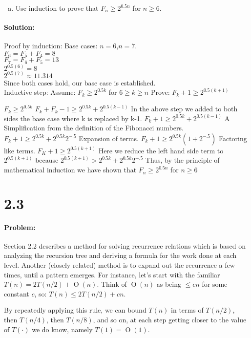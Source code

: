 \documentclass[12pt]{article}
\newcommand{\BigO}[1]{\ensuremath{\operatorname{O}\left(#1\right)}}
\begin{document}
\begin{enumerate}[(a)]
\item Use induction to prove that $F_n \geq 2^{0.5n}$ for $n \geq 6$.
\end{enumerate}

\paragraph{Solution:}
Proof by induction:
Base cases: $n=6$,$n=7$. \\
    $F_6 = F_5 + F_4 = 8$ \\
    $F_7 = F_6 + F_5 = 13$ \\
    $2^{0.5(6)} = 8$ \\
    $2^{0.5(7)} \approx 11.314$ \\
    Since both cases hold, our base case is established. \\

Inductive step:
	Assume: $F_k \geq 2^{0.5k}$ for $6 \geq k \geq n$
	Prove: $F_k+1 \geq 2^{0.5(k+1)}$

	$F_k \geq 2^{0.5k}$
	$F_k + F_k-1 \geq 2^{0.5k} + 2^{0.5(k-1)}$
		In the above step we added to both sides the base case where k is replaced by k-1.
	$F_k+1 \geq 2^{0.5k} + 2^{0.5(k-1)}$
		A Simplification from the definition of the Fibonacci numbers.
	$F_k+1 \geq 2^{0.5k} + 2^{0.5k}2^{-.5}$
		Expansion of terms.
	$F_k+1 \geq 2^{0.5k}(1 + 2^{-.5})$
		Factoring like terms.
	$F_K+1 \geq 2^{0.5(k+1)}$
		Here we reduce the left hand side term to $2^{0.5(k+1)}$ because $2^{0.5(k+1)} > 2^{0.5k}+2^{0.5k}2^{-.5}$ 
	Thus, by the principle of mathematical induction we have shown that $F_n \geq 2^{0.5n}$ for $n \geq 6$ 
	
	
\section*{2.3}
\paragraph{Problem:}
Section 2.2 describes a method for solving recurrence relations which is
based on analyzing the recursion tree and deriving a formula for the
work done at each level.  Another (closely related) method is to expand
out the recurrence a few times, until a pattern emerges. For instance,
let’s start with the familiar $T(n) = 2T(n/2) + \BigO{n}$. Think of
$\BigO{n}$ as being $\leq cn$ for some constant $c$,
so: $T(n) \leq 2T(n/2) + cn$. 

By repeatedly applying this rule, we can bound $T(n)$ in terms of $T(n/2)$,
then $T(n/4)$, then $T(n/8)$, and so on, at each step getting closer to
the value of $T(\cdot)$ we do know,
namely $T(1) = \BigO{1}$.
\end{document}
